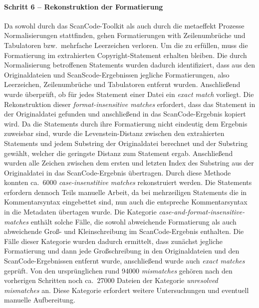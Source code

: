 \paragraph{Schritt 6 -- Rekonstruktion der Formatierung}
Da sowohl durch das ScanCode-Toolkit als auch durch die metaeffekt Prozesse Normalisierungen stattfinden, gehen Formatierungen with Zeilenumbrüche und Tabulatoren bzw.\ mehrfache Leerzeichen verloren.
Um die  zu erfüllen, muss die Formatierung im extrahierten Copyright-Statement erhalten bleiben.
Die durch Normalisierung betroffenen Statements wurden dadurch identifiziert, dass aus den Originaldateien und ScanScode-Ergebnissen jegliche Formatierungen, also Leerzeichen, Zeilenumbrüche und Tabulatoren entfernt wurden.
Anschließend wurde überprüft, ob für jedes Statement einer Datei ein \textit{exact match} vorliegt.
Die Rekonstruktion dieser \textit{format-insensitive matches} erfordert, dass das Statement in der Originaldatei gefunden und anschließend in das ScanCode-Ergebnis kopiert wird.
Da die Statements durch ihre Formatierung nicht eindeutig dem Ergebnis zuweisbar sind, wurde die Levenstein-Distanz zwischen den extrahierten Statements und jedem Substring der Originaldatei berechnet und der Substring gewählt, welcher die geringste Distanz zum Statement ergab.
Anschließend wurden alle Zeichen zwischen dem ersten und letzten Index des Substring aus der Originaldatei in das ScanCode-Ergebnis übertragen.
Durch diese Methode konnten ca.\ \num{6000} \textit{case-insenstitive matches} rekonstruiert werden.
Die Statements erfordern dennoch Teils manuelle Arbeit, da bei mehrzeiligen Statements die in Kommentarsyntax eingebettet sind, nun auch die entspreche Kommentarsyntax in die Metadaten übertagen wurde.
Die Kategorie \textit{case-and-format-insensitive-matches} enthält solche Fälle, die sowohl abweichende Formatierung als auch abweichende Groß- und Kleinschreibung im ScanCode-Ergebnis enthalten.
Die Fälle dieser Kategorie wurden dadurch ermittelt, dass zunächst jegliche Formatierung und dann jede Großschreibung in den Originaldateien und den ScanCode-Ergebnissen entfernt wurde, anschließend wurde auch \textit{exact matches} geprüft.
Von den ursprünglichen rund \num{94000} \textit{mismatches} gehören nach den vorherigen Schritten noch ca.\ \num{27000} Dateien der Kategorie \textit{unresolved mismatches} an.
Diese Kategorie erfordert weitere Untersuchungen und eventuell manuelle Aufbereitung.

